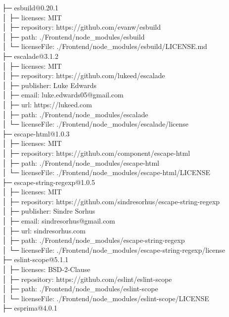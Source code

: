 ├─ esbuild@0.20.1\\
│  ├─ licenses: MIT\\
│  ├─ repository: https://github.com/evanw/esbuild\\
│  ├─ path: ./Frontend/node\_modules/esbuild\\
│  └─ licenseFile: ./Frontend/node\_modules/esbuild/LICENSE.md\\
├─ escalade@3.1.2\\
│  ├─ licenses: MIT\\
│  ├─ repository: https://github.com/lukeed/escalade\\
│  ├─ publisher: Luke Edwards\\
│  ├─ email: luke.edwards05@gmail.com\\
│  ├─ url: https://lukeed.com\\
│  ├─ path: ./Frontend/node\_modules/escalade\\
│  └─ licenseFile: ./Frontend/node\_modules/escalade/license\\
├─ escape-html@1.0.3\\
│  ├─ licenses: MIT\\
│  ├─ repository: https://github.com/component/escape-html\\
│  ├─ path: ./Frontend/node\_modules/escape-html\\
│  └─ licenseFile: ./Frontend/node\_modules/escape-html/LICENSE\\
├─ escape-string-regexp@1.0.5\\
│  ├─ licenses: MIT\\
│  ├─ repository: https://github.com/sindresorhus/escape-string-regexp\\
│  ├─ publisher: Sindre Sorhus\\
│  ├─ email: sindresorhus@gmail.com\\
│  ├─ url: sindresorhus.com\\
│  ├─ path: ./Frontend/node\_modules/escape-string-regexp\\
│  └─ licenseFile: ./Frontend/node\_modules/escape-string-regexp/license\\
├─ eslint-scope@5.1.1\\
│  ├─ licenses: BSD-2-Clause\\
│  ├─ repository: https://github.com/eslint/eslint-scope\\
│  ├─ path: ./Frontend/node\_modules/eslint-scope\\
│  └─ licenseFile: ./Frontend/node\_modules/eslint-scope/LICENSE\\
├─ esprima@4.0.1\\
